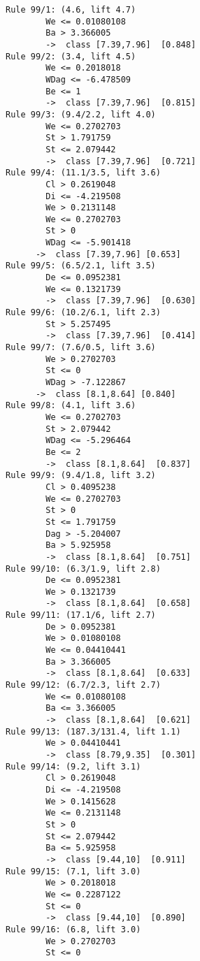 \begin{tcolorbox}[title=Reglas de clasificación para identificar intervalos de notas.]
  \makeatletter
  \makeatother
\begin{multicols}{3}
    \begin{verbatim}
Rule 99/1: (4.6, lift 4.7)
        We <= 0.01080108
        Ba > 3.366005
        ->  class [7.39,7.96]  [0.848]
Rule 99/2: (3.4, lift 4.5)
        We <= 0.2018018
        WDag <= -6.478509
        Be <= 1
        ->  class [7.39,7.96]  [0.815]
Rule 99/3: (9.4/2.2, lift 4.0)
        We <= 0.2702703
        St > 1.791759
        St <= 2.079442
        ->  class [7.39,7.96]  [0.721]
Rule 99/4: (11.1/3.5, lift 3.6)
        Cl > 0.2619048
        Di <= -4.219508
        We > 0.2131148
        We <= 0.2702703
        St > 0
        WDag <= -5.901418
      ->  class [7.39,7.96] [0.653]
Rule 99/5: (6.5/2.1, lift 3.5)
        De <= 0.0952381
        We <= 0.1321739
        ->  class [7.39,7.96]  [0.630]
Rule 99/6: (10.2/6.1, lift 2.3)
        St > 5.257495
        ->  class [7.39,7.96]  [0.414]
Rule 99/7: (7.6/0.5, lift 3.6)
        We > 0.2702703
        St <= 0
        WDag > -7.122867
      ->  class [8.1,8.64] [0.840]
Rule 99/8: (4.1, lift 3.6)
        We <= 0.2702703
        St > 2.079442
        WDag <= -5.296464
        Be <= 2
        ->  class [8.1,8.64]  [0.837]
Rule 99/9: (9.4/1.8, lift 3.2)
        Cl > 0.4095238
        We <= 0.2702703
        St > 0
        St <= 1.791759
        Dag > -5.204007
        Ba > 5.925958
        ->  class [8.1,8.64]  [0.751]
Rule 99/10: (6.3/1.9, lift 2.8)
        De <= 0.0952381
        We > 0.1321739
        ->  class [8.1,8.64]  [0.658]
Rule 99/11: (17.1/6, lift 2.7)
        De > 0.0952381
        We > 0.01080108
        We <= 0.04410441
        Ba > 3.366005
        ->  class [8.1,8.64]  [0.633]
Rule 99/12: (6.7/2.3, lift 2.7)
        We <= 0.01080108
        Ba <= 3.366005
        ->  class [8.1,8.64]  [0.621]   
Rule 99/13: (187.3/131.4, lift 1.1)
        We > 0.04410441
        ->  class [8.79,9.35]  [0.301]       
Rule 99/14: (9.2, lift 3.1)
        Cl > 0.2619048
        Di <= -4.219508
        We > 0.1415628
        We <= 0.2131148
        St > 0
        St <= 2.079442
        Ba <= 5.925958
        ->  class [9.44,10]  [0.911]
Rule 99/15: (7.1, lift 3.0)
        We > 0.2018018
        We <= 0.2287122
        St <= 0
        ->  class [9.44,10]  [0.890]
Rule 99/16: (6.8, lift 3.0)
        We > 0.2702703
        St <= 0

\end{verbatim}
\end{multicols}
\end{tcolorbox}
